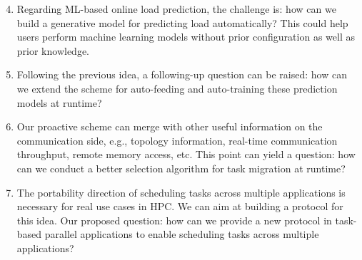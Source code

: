 \begin{enumerate}[label=(\arabic*)]
	\setcounter{enumi}{3}
	\item Regarding ML-based online load prediction, the challenge is: how can we build a generative model for predicting load automatically? This could help users perform machine learning models without prior configuration as well as prior knowledge.
	\item Following the previous idea, a following-up question can be raised: how can we extend the scheme for auto-feeding and auto-training these prediction models at runtime?
	\item Our proactive scheme can merge with other useful information on the communication side, e.g., topology information, real-time communication throughput, remote memory access, etc. This point can yield a question: how can we conduct a better selection algorithm for task migration at runtime?
	\item The portability direction of scheduling tasks across multiple applications is necessary for real use cases in HPC. We can aim at building a protocol for this idea. Our proposed question: how can we provide a new protocol in task-based parallel applications to enable scheduling tasks across multiple applications?
\end{enumerate}
